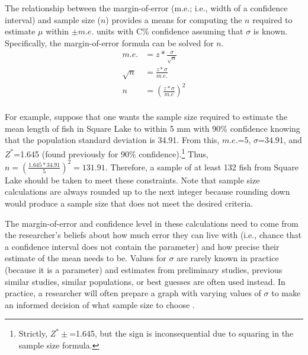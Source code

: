\documentclass[10pt,openany]{book}\usepackage[]{graphicx}\usepackage[]{color}
\begin{document}

The relationship between the margin-of-error (m.e.; i.e., width of a confidence interval) and sample size ($n$) provides a means for computing the $n$ required to estimate $\mu$ within $\pm m.e.$ units with C\% confidence assuming that $\sigma$ is known.  Specifically, the margin-of-error formula can be solved for $n$.
\[
  \begin{split}
    m.e. &= z*\frac{\sigma}{\sqrt{n}} \\
    \sqrt{n} &= \frac{z*\sigma}{m.e.} \\
    n &= \left(\frac{z*\sigma}{m.e}\right)^{2} \\
  \end{split}
\]

For example, suppose that one wants the sample size required to estimate the mean length of fish in Square Lake to within 5 mm with 90\% confidence knowing that the population standard deviation is 34.91.  From this, $m.e.$=5, $\sigma$=34.91, and $Z^{*}$=1.645 (found previously for 90\% confidence).\footnote{Strictly, $Z^{*}\pm$=1.645, but the sign is inconsequential due to squaring in the sample size formula.}  Thus, $n = \left(\frac{1.645*34.91}{5}\right)^{2} = 131.91$.  Therefore, a sample of at least 132 fish from Square Lake should be taken to meet these constraints.  Note that sample size calculations are always rounded up to the next integer because rounding down would produce a sample size that does not meet the desired criteria.


The margin-of-error and confidence level in these calculations need to come from the researcher's beliefs about how much error they can live with (i.e., chance that a confidence interval does not contain the parameter) and how precise their estimate of the mean needs to be.  Values for $\sigma$ are rarely known in practice (because it is a parameter) and estimates from preliminary studies, previous similar studies, similar populations, or best guesses are often used instead.  In practice, a researcher will often prepare a graph with varying values of $\sigma$ to make an informed decision of what sample size to choose .
\end{document}
